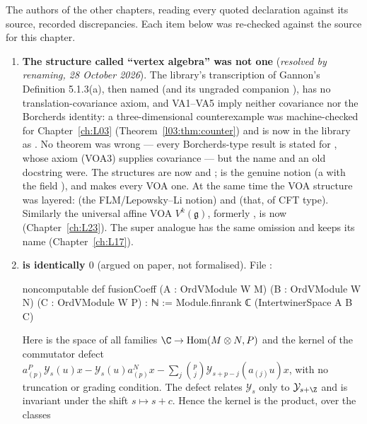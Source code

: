 The authors of the other chapters, reading every quoted declaration against its source, recorded
discrepancies. Each item below was re-checked against the source for this chapter.
\begin{enumerate}
\item \textbf{The structure called ``vertex algebra'' was not one} (\emph{resolved by renaming, 28 October 2026}). The
  library's transcription of Gannon's Definition 5.1.3(a), then named  (and its ungraded companion
  ), has no translation-covariance axiom, and VA1--VA5 imply neither covariance nor the Borcherds identity:
  a three-dimensional counterexample was machine-checked for Chapter~\ref{ch:L03} (Theorem~\ref{l03:thm:counter}) and is
  now in the library as . No theorem was wrong --- every Borcherds-type result
  is stated for , whose axiom (VOA3) supplies covariance --- but the name and an old
  docstring were. The structures are now  and ;  is the
  genuine notion (a  with the field ), and
   makes every VOA one. At the same time the VOA structure was layered:
   (the FLM/Lepowsky--Li notion) and  (that, of CFT type).
  Similarly the universal affine VOA $V^k(\mathfrak g)$, formerly , is now 
  (Chapter~\ref{ch:L23}). The super analogue  has the same omission and keeps its name
  (Chapter~\ref{ch:L17}).
\item \textbf{ is identically $0$} (argued on paper, not formalised). File
  :
\begin{leancode}
noncomputable def fusionCoeff (A : OrdVModule W M) (B : OrdVModule W N) (C : OrdVModule W P) : ℕ :=
  Module.finrank ℂ (IntertwinerSpace A B C)
\end{leancode}
  Here  is the space of all families $\C\to\mathrm{Hom}(M\otimes N,P)$
  and  the kernel of the commutator defect
  $a^P_{(p)}\mathcal Y_s(u)x-\mathcal Y_s(u)a^N_{(p)}x-\sum_j\binom pj\mathcal Y_{s+p-j}(a_{(j)}u)x$, with no
  truncation or grading condition. The defect relates $\mathcal Y_s$ only to $\mathcal Y_{s+\Z}$ and is
  invariant under the shift $s\mapsto s+c$. Hence the kernel is the product, over the classes

\end{enumerate}
